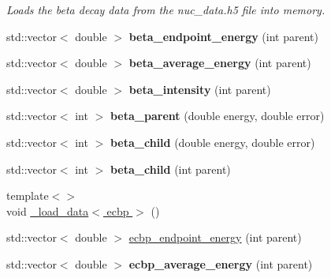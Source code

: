 \begin{DoxyCompactItemize}
\begin{DoxyCompactList}\small\item\em Loads the beta decay data from the nuc\-\_\-data.\-h5 file into memory. \end{DoxyCompactList}\item 
\hypertarget{namespacepyne_a1b55f98ecca83a9191eb30ee9ce6592b}{std\-::vector$<$ double $>$ {\bfseries beta\-\_\-endpoint\-\_\-energy} (int parent)}\label{namespacepyne_a1b55f98ecca83a9191eb30ee9ce6592b}

\item 
\hypertarget{namespacepyne_ab385d0c04c1da2033bdf0e8309a293cb}{std\-::vector$<$ double $>$ {\bfseries beta\-\_\-average\-\_\-energy} (int parent)}\label{namespacepyne_ab385d0c04c1da2033bdf0e8309a293cb}

\item 
\hypertarget{namespacepyne_a818e4cda17d0e3746e7c39c452505f03}{std\-::vector$<$ double $>$ {\bfseries beta\-\_\-intensity} (int parent)}\label{namespacepyne_a818e4cda17d0e3746e7c39c452505f03}

\item 
\hypertarget{namespacepyne_a4f6a73d374babad7eae37b1a5ede31b1}{std\-::vector$<$ int $>$ {\bfseries beta\-\_\-parent} (double energy, double error)}\label{namespacepyne_a4f6a73d374babad7eae37b1a5ede31b1}

\item 
\hypertarget{namespacepyne_a06a66d50d789c15eb06403145c9e8f78}{std\-::vector$<$ int $>$ {\bfseries beta\-\_\-child} (double energy, double error)}\label{namespacepyne_a06a66d50d789c15eb06403145c9e8f78}

\item 
\hypertarget{namespacepyne_aecf3b1f9104cd326141aaabf6dc1dd85}{std\-::vector$<$ int $>$ {\bfseries beta\-\_\-child} (int parent)}\label{namespacepyne_aecf3b1f9104cd326141aaabf6dc1dd85}

\item 
{\footnotesize template$<$$>$ }\\void \hyperlink{namespacepyne_aa0e5344b00be282952a8da5cc928b387}{\-\_\-load\-\_\-data$<$ ecbp $>$} ()
\item 
std\-::vector$<$ double $>$ \hyperlink{namespacepyne_a01290076b747cd8f6fb8785d698d9319}{ecbp\-\_\-endpoint\-\_\-energy} (int parent)
\item 
\hypertarget{namespacepyne_aae965f50671162fd430ecc100a6734c3}{std\-::vector$<$ double $>$ {\bfseries ecbp\-\_\-average\-\_\-energy} (int parent)}\label{namespacepyne_aae965f50671162fd430ecc100a6734c3}


\end{DoxyCompactItemize}
